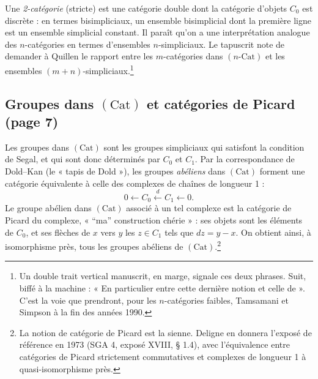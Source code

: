 \documentclass[11pt,a4paper]{article}
\begin{document}
Une \emph{2-catégorie} (stricte) est une catégorie double dont la catégorie
d'objets $C_0$ est discrète : en termes bisimpliciaux, un ensemble bisimplicial
dont la première ligne est un ensemble simplicial constant. Il paraît qu'on a
une interprétation analogue des $n$-catégories en termes d'ensembles
$n$-simpliciaux. Le tapuscrit note de demander à Quillen le rapport entre les
$m$-catégories dans $(n\text{-Cat})$ et les ensembles
$(m+n)$-simpliciaux.\footnote{Un double trait vertical manuscrit, en marge,
signale ces deux phrases. Suit, biffé à la machine : « En particulier entre
cette dernière notion et celle de ». C'est la voie que prendront, pour les
$n$-catégories faibles, Tamsamani et Simpson à la fin des années 1990.}

\subsection*{Groupes dans $(\mathrm{Cat})$ et catégories de Picard (page 7)}

Les groupes dans $(\mathrm{Cat})$ sont les groupes simpliciaux qui satisfont
la condition de Segal, et qui sont donc déterminés par $C_0$ et $C_1$. Par la
correspondance de Dold--Kan (le « tapis de Dold »), les groupes
\emph{abéliens} dans $(\mathrm{Cat})$ forment une catégorie équivalente à celle
des complexes de chaînes de longueur 1 :
\[
0 \longleftarrow C_0 \xleftarrow{\ d\ } C_1 \longleftarrow 0 .
\]
Le groupe abélien dans $(\mathrm{Cat})$ associé à un tel complexe est la
catégorie de Picard du complexe, « “ma” construction chérie » : ses objets sont
les éléments de $C_0$, et ses flèches de $x$ vers $y$ les $z \in C_1$ tels que
$dz = y - x$. On obtient ainsi, à isomorphisme près, tous les groupes abéliens
de $(\mathrm{Cat})$.\footnote{La notion de catégorie de Picard est la sienne.
Deligne en donnera l'exposé de référence en 1973 (SGA 4, exposé XVIII, §
1.4), avec l'équivalence entre catégories de Picard strictement commutatives
et complexes de longueur 1 à quasi-isomorphisme près.}
\end{document}
